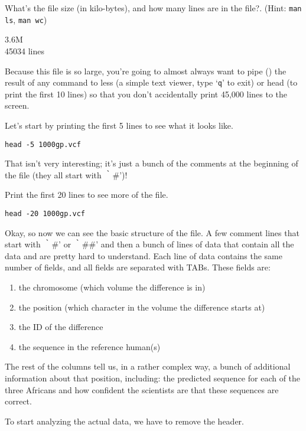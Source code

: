 \begin{questions}
What's the file size (in kilo-bytes), and how many lines are in the file?. (Hint: \texttt{man ls}, \texttt{man wc}) \\
\begin{answer}
3.6M \\
45034 lines \\
\end{answer}
\end{questions}


\begin{note}
Because this file is so large, you're going to almost always want to pipe (\texttt{\textbar}) the result of any command to less (a simple text viewer, type `\texttt{q}' to exit) or head (to print the first 10 lines) so that you don't accidentally print 45,000 lines to the screen.
\end{note}

\begin{steps}
Let's start by printing the first 5 lines to see what it looks like.
\begin{lstlisting}
head -5 1000gp.vcf
\end{lstlisting}
\end{steps}

\begin{note}
That isn't very interesting; it's just a bunch of the comments at the beginning of the file (they all start with ｀\#')! 
\end{note}

\begin{steps}
Print the first 20 lines to see more of the file.
\begin{lstlisting}
head -20 1000gp.vcf
\end{lstlisting}
\end{steps}

\begin{note}
Okay, so now we can see the basic structure of the file. A few comment lines that start with ｀\#' or ｀\#\#' and then a bunch of lines of data that contain all the data and are pretty hard to understand. Each line of data contains the same number of fields, and all fields are separated with TABs. These fields are:
\begin{enumerate}[style=multiline,labelindent=0cm,align=left,leftmargin=0.5cm]
\item the chromosome (which volume the difference is in)
\item the position (which character in the volume the difference starts at)
\item the ID of the difference
\item the sequence in the reference human(s)
\end{enumerate}
The rest of the columns tell us, in a rather complex way, a bunch of additional information about that position, including: the predicted sequence for each of the three Africans and how confident the scientists are that these sequences are correct.

To start analyzing the actual data, we have to remove the header.
\end{note}

